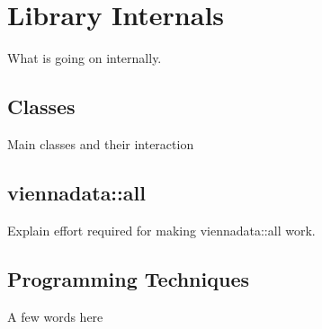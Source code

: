 \chapter{Library Internals} \label{chap:internals}
What is going on internally.

\section{Classes}
Main classes and their interaction

\section{viennadata::all}
Explain effort required for making viennadata::all work.

\section{Programming Techniques}
A few words here